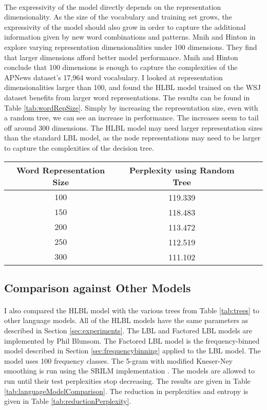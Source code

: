 \paragraph{}
The expressivity of the model directly depends on the representation dimensionality. As the size of the vocabulary and training set grows, the expressivity of the model should also grow in order to capture the additional information given by new word combinations and patterns. Mnih and Hinton in \cite{MnihHinton2009} explore varying representation dimensionalities under 100 dimensions. They find that larger dimensions afford better model performance. Mnih and Hinton conclude that 100 dimensions is enough to capture the complexities of the APNews dataset's 17,964 word vocabulary. I looked at representation dimensionalities larger than 100, and found the HLBL model trained on the WSJ dataset benefits from larger word representations. The results can be found in Table \ref{tab:wordRepSize}. Simply by increasing the representation size, even with a random tree, we can see an increase in performance. The increases seem to tail off around 300 dimensions.  The HLBL model may need larger representation sizes than the standard LBL model, as the node representations may need to be larger to capture the complexities of the decision tree.


\begin{table*} \centering
{}
\begin{tabular}{@{}cccc@{}}\toprule
Word Representation Size & Perplexity using Random Tree\\ 
\midrule
$100$ & 119.339 \\
$150$ & 118.483 \\
$200$ & 113.472 \\
$250$ & 112.519 \\
$300$ & 111.102 \\
\bottomrule
\end{tabular}
\caption{The effect of word representation size on test perplexity.}
\label{tab:wordRepSize}
\end{table*}

\subsection{Comparison against Other Models}
\paragraph{}
I also compared the HLBL model with the various trees from Table \ref{tab:trees} to other language models. All of the HLBL models have the same parameters as described in Section \ref{sec:experiments}. The LBL and Factored LBL models are implemented by Phil Blunsom. The Factored LBL model is the frequency-binned model described in Section \ref{sec:frequencybinning} applied to the LBL model. The model uses 100 frequency classes. The 5-gram with modified Kneser-Ney smoothing is run using the SRILM implementation \cite{Alumae2010}.
The models are allowed to run until their test perplexities stop decreasing. The results are given in Table \ref{tab:languageModelComparison}. The reduction in perplexities and entropy is given in Table \ref{tab:reductionPerplexity}. 

